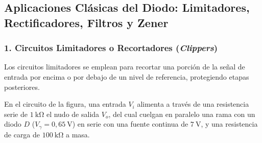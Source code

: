 \subsection{Aplicaciones Clásicas del Diodo: Limitadores, Rectificadores, Filtros y Zener}

\subsubsection{1. Circuitos Limitadores o Recortadores (\textit{Clippers})}
Los circuitos limitadores se emplean para recortar una porción de la señal de entrada por encima o por debajo de un nivel de referencia, protegiendo etapas posteriores.
\begin{ejemplo}
En el circuito de la figura, una entrada $V_i$ alimenta a través de una resistencia serie de $1\ \si{\kilo\ohm}$ el nudo de salida $V_o$, del cual cuelgan en paralelo una rama con un diodo $D$ ($V_\gamma = 0{,}65\ \si{\volt}$) en serie con una fuente continua de $7\ \si{\volt}$, y una resistencia de carga de $100\ \si{\kilo\ohm}$ a masa.

\begin{center}
\end{center}


\end{ejemplo}
